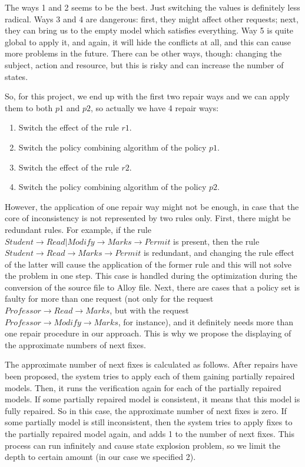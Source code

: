\documentclass{acm_proc_article-sp}
\begin{document}
The ways 1 and 2 seems to be the best. Just switching the values is definitely less radical. Ways 3 and 4 are dangerous: first, they might affect other requests; next, they can bring us to the empty model which satisfies everything. Way 5 is quite global to apply it, and again, it will hide the conflicts at all, and this can cause more problems in the future. There can be other ways, though: changing the subject, action and resource, but this is risky and can increase the number of states. 

So, for this project, we end up with the first two repair ways and we can apply them to both $p1$ and $p2$, so actually we have 4 repair ways:

\begin{enumerate}
\item Switch the effect of the rule $r1$.
\item Switch the policy combining algorithm of the policy $p1$.
\item Switch the effect of the rule $r2$.
\item Switch the policy combining algorithm of the policy $p2$.
\end{enumerate}

However, the application of one repair way might not be enough, in case that the core of inconsistency is not represented by two rules only. First, there might be redundant rules. For example, if the rule $Student \to Read|Modify \to Marks \to Permit$ is present, then the rule $Student \to Read \to Marks \to Permit$ is redundant, and changing the rule effect of the latter will cause the application of the former rule and this will not solve the problem in one step. This case is handled during the optimization during the conversion of the source file to Alloy file. Next, there are cases that a policy set is faulty for more than one request (not only for the request $Professor \to Read \to Marks$, but with the request  $Professor \to  Modify \to Marks$, for instance), and it definitely needs more than one repair procedure in our approach. This is why we propose the displaying of the approximate numbers of next fixes.

The approximate number of next fixes is calculated as follows. After repairs have been proposed, the system tries to apply each of them gaining partially repaired models. Then, it runs the verification again for each of the partially repaired models. If some partially repaired model is consistent, it means that this model is fully repaired. So in this case, the approximate number of next fixes is zero. If some partially model is still inconsistent, then the system tries to apply fixes to the partially repaired model again, and adds 1 to the number of next fixes. This process can run infinitely and cause state explosion problem, so we limit the depth to certain amount (in our case we specified 2).
\end{document}
